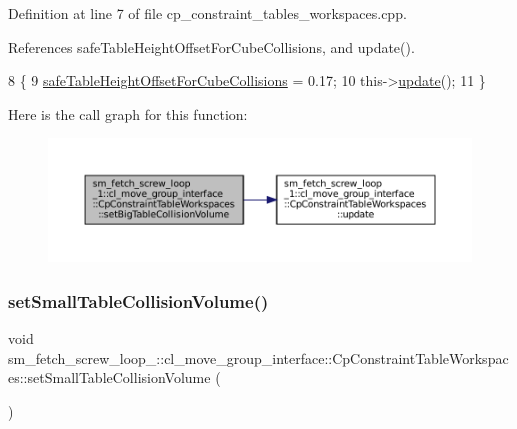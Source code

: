 Definition at line 7 of file cp\+\_\+constraint\+\_\+tables\+\_\+workspaces.\+cpp.



References safe\+Table\+Height\+Offset\+For\+Cube\+Collisions, and update().


\begin{DoxyCode}
8         \{
9             \hyperlink{classsm__fetch__screw__loop__1_1_1cl__move__group__interface_1_1CpConstraintTableWorkspaces_a63eb3865595f71235002363b5df6c4a0}{safeTableHeightOffsetForCubeCollisions} = 0.17;
10             this->\hyperlink{classsm__fetch__screw__loop__1_1_1cl__move__group__interface_1_1CpConstraintTableWorkspaces_a24fc1c2ba2d6f09df2cca9bf0c3d3b20}{update}();
11         \}
\end{DoxyCode}
Here is the call graph for this function\+:
\nopagebreak
\begin{figure}[H]
\begin{center}
\leavevmode
\includegraphics[width=350pt]{classsm__fetch__screw__loop__1_1_1cl__move__group__interface_1_1CpConstraintTableWorkspaces_ae9bf6937e39e58a069bce3d02b617402_cgraph}
\end{center}
\end{figure}
\mbox{\label{classsm__fetch__screw__loop__1_1_1cl__move__group__interface_1_1CpConstraintTableWorkspaces_a9b66f921573b86d249ecafc3161d1308}} 
\subsubsection{\texorpdfstring{set\+Small\+Table\+Collision\+Volume()}{setSmallTableCollisionVolume()}}
{\footnotesize\ttfamily void sm\+\_\+fetch\+\_\+screw\+\_\+loop\+\_\+::cl\+\_\+move\+\_\+group\+\_\+interface\+::\+Cp\+Constraint\+Table\+Workspaces\+::set\+Small\+Table\+Collision\+Volume (\begin{DoxyParamCaption}{ }\end{DoxyParamCaption})}



